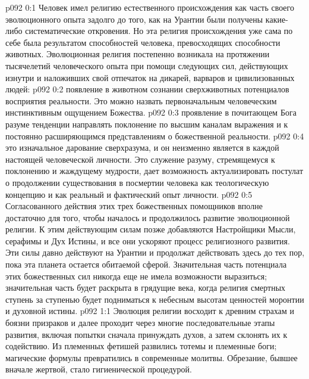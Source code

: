 \author{Мелхиседек}
\vs p092 0:1 Человек имел религию естественного происхождения как часть своего эволюционного опыта задолго до того, как на Урантии были получены какие\hyp{}либо систематические откровения. Но эта религия  происхождения уже сама по себе была результатом способностей человека, превосходящих способности животных. Эволюционная религия постепенно возникала на протяжении тысячелетий человеческого опыта при помощи следующих сил, действующих изнутри и наложивших свой отпечаток на дикарей, варваров и цивилизованных людей:
\vs p092 0:2 \bibnobreakspace {} появление в животном сознании сверхживотных потенциалов восприятия реальности. Это можно назвать первоначальным человеческим инстинктивным ощущением Божества.
\vs p092 0:3 \pc {}\bibnobreakspace {} проявление в почитающем Бога разуме тенденции направлять поклонение по высшим каналам выражения и к постоянно расширяющимся представлениям о божественной реальности.
\vs p092 0:4 \pc {}\bibnobreakspace {} это изначальное дарование сверхразума, и он неизменно является в каждой настоящей человеческой личности. Это служение разуму, стремящемуся к поклонению и жаждущему мудрости, дает возможность актуализировать постулат о продолжении существования в посмертии человека как теологическую концепцию и как реальный и фактический опыт личности.
\vs p092 0:5 \pc Согласованного действия этих трех божественных помощников вполне достаточно для того, чтобы началось и продолжилось развитие эволюционной религии. К этим действующим силам позже добавляются Настройщики Мысли, серафимы и Дух Истины, и все они ускоряют процесс религиозного развития. Эти силы давно действуют на Урантии и продолжат действовать здесь до тех пор, пока эта планета остается обитаемой сферой. Значительная часть потенциала этих божественных сил никогда еще не имела возможности выразиться; значительная часть будет раскрыта в грядущие века, когда религия смертных ступень за ступенью будет подниматься к небесным высотам ценностей моронтии и духовной истины.
\vs p092 1:1 Эволюция религии восходит к древним страхам и боязни призраков и далее проходит через многие последовательные этапы развития, включая попытки сначала принуждать духов, а затем склонять их к содействию. Из племенных фетишей развились тотемы и племенные боги; магические формулы превратились в современные молитвы. Обрезание, бывшее вначале жертвой, стало гигиенической процедурой.
